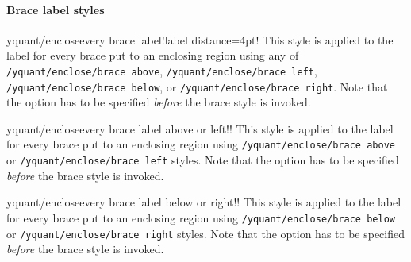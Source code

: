 \documentclass{scrartcl}
\makeatletter
\let\unpatched@minted@inline@iii=\minted@inline@iii%
\def\patched@minted@inline@iii#1{%
      \unpatched@minted@inline@iii{#1}%
      \par%
      \endgroup\egroup\nopagebreak\vskip-\parskip\nopagebreak%
      \noindent\ignorespaces%
   }
\def\patch@mintinline{%
      \let\minted@inline@iii=\patched@minted@inline@iii%
   }
\let\unpatched@RobustMintInlineProcess@ii=\RobustMintInlineProcess@ii
\def\patched@RobustMintInlineProcess@ii#1{%
      \unpatched@RobustMintInlineProcess@ii{#1}%
      \par%
      \endgroup\egroup\nopagebreak\vskip-\parskip\nopagebreak%
      \noindent\ignorespaces%
   }
\def\patch@mintinline{%
      \let\RobustMintInlineProcess@ii=\patched@RobustMintInlineProcess@ii%
   }
\newenvironment{option*}[3][]{\ifhmode\par\fi\addvspace{5mm}%
   \vbox\bgroup\begingroup%
      \patch@mintinline%
      \raggedleft%
      \hspace*{-1cm}%
      \phantomsection\label{yquant:/#2/#3}%
      \texttt{\ifstrempty{#1}\relax{\compat{#1}}\textcolor{gray}{/#2/}\textcolor{mintgreen}{#3}}\hfill default: %
      \tex}{\par\addvspace{5mm}}
\def\ttlink{\link\texttt}
\makeatother
\begin{document}

            \paragraph{Brace label styles}\leavevmode
               \begin{option*}{yquant/enclose}{every brace label}!label distance=4pt!
                  This style is applied to the label for every brace put to an enclosing region using any of \ttlink{/yquant/enclose/brace above}, \ttlink{/yquant/enclose/brace left}, \ttlink{/yquant/enclose/brace below}, or \ttlink{/yquant/enclose/brace right}.
                  Note that the option has to be specified \emph{before} the brace style is invoked.
               \end{option*}


               \begin{option*}{yquant/enclose}{every brace label above or left}!!
                  This style is applied to the label for every brace put to an enclosing region using \ttlink{/yquant/enclose/brace above} or \ttlink{/yquant/enclose/brace left} styles.
                  Note that the option has to be specified \emph{before} the brace style is invoked.
               \end{option*}


               \begin{option*}{yquant/enclose}{every brace label below or right}!!
                  This style is applied to the label for every brace put to an enclosing region using \ttlink{/yquant/enclose/brace below} or \ttlink{/yquant/enclose/brace right} styles.
                  Note that the option has to be specified \emph{before} the brace style is invoked.
               \end{option*}
\end{document}

